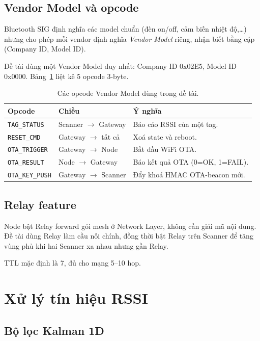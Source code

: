 \subsection{Vendor Model và opcode}

Bluetooth SIG định nghĩa các model chuẩn (đèn on/off, cảm biến nhiệt độ,\ldots) nhưng cho phép mỗi vendor định nghĩa \textit{Vendor Model} riêng, nhận biết bằng cặp (Company ID, Model ID).

Đề tài dùng một Vendor Model duy nhất: Company ID 0x02E5, Model ID 0x0000. Bảng~\ref{tab:opcodes} liệt kê 5 opcode 3-byte.

\begin{table}[htp]
    \centering
    \caption{Các opcode Vendor Model dùng trong đề tài.}
    \label{tab:opcodes}
    \begin{tabular}{lll}
        \hline
        \textbf{Opcode} & \textbf{Chiều} & \textbf{Ý nghĩa} \\
        \hline
        \texttt{TAG\_STATUS}    & Scanner $\to$ Gateway    & Báo cáo RSSI của một tag. \\
        \texttt{RESET\_CMD}     & Gateway $\to$ tất cả     & Xoá state và reboot. \\
        \texttt{OTA\_TRIGGER}   & Gateway $\to$ Node       & Bắt đầu WiFi OTA. \\
        \texttt{OTA\_RESULT}    & Node $\to$ Gateway       & Báo kết quả OTA (0=OK, 1=FAIL). \\
        \texttt{OTA\_KEY\_PUSH} & Gateway $\to$ Scanner    & Đẩy khoá HMAC OTA-beacon mới. \\
        \hline
    \end{tabular}
\end{table}

\subsection{Relay feature}

Node bật Relay forward gói mesh ở Network Layer, không cần giải mã nội dung. Đề tài dùng Relay làm cầu nối chính, đồng thời bật Relay trên Scanner để tăng vùng phủ khi hai Scanner xa nhau nhưng gần Relay.

TTL mặc định là 7, đủ cho mạng 5--10 hop.

\section{Xử lý tín hiệu RSSI}

\subsection{Bộ lọc Kalman 1D}

